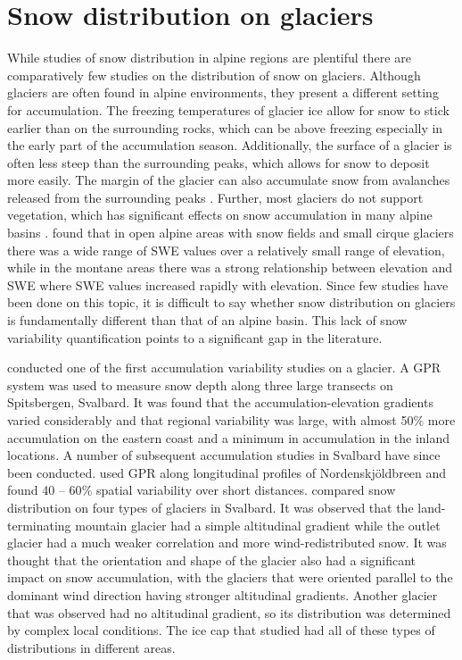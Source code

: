 \documentclass{sfuthesis}
\begin{document}
\section{Snow distribution on glaciers}
While studies of snow distribution in alpine regions are plentiful \citep[and sources within]{Clark2011} there are comparatively few studies on the distribution of snow on glaciers. Although glaciers are often found in alpine environments, they present a different setting for accumulation. The freezing temperatures of glacier ice allow for snow to stick earlier than on the surrounding rocks, which can be above freezing especially in the early part of the accumulation season. Additionally, the surface of a glacier is often less steep than the surrounding peaks, which allows for snow to deposit more easily. The margin of the glacier can also accumulate snow from avalanches released from the surrounding peaks \citep{Bloschl1991, Mott2008}. Further, most glaciers do not support vegetation, which has significant effects on snow accumulation in many alpine basins \citep{Pomeroy1999}. \cite{Alford1985} found that in open alpine areas with snow fields and small cirque glaciers there was a wide range of SWE values over a relatively small range of elevation, while in the montane areas there was a strong relationship between elevation and SWE where SWE values increased rapidly with elevation. Since few studies have been done on this topic, it is difficult to say whether snow distribution on glaciers is fundamentally different than that of an alpine basin. This lack of snow variability quantification points to a significant gap in the literature.

\cite{Winther1998} conducted one of the first accumulation variability studies on a glacier. A GPR system was used to measure snow depth along three large transects on Spitsbergen, Svalbard. It was found that the accumulation-elevation gradients varied considerably and that regional variability was large, with almost 50$\%$ more accumulation on the eastern coast and a minimum in accumulation in the inland locations. A number of subsequent accumulation studies in Svalbard have since been conducted. \cite{Palli2002} used GPR along longitudinal profiles of Nordenskj\"{o}ldbreen and found 40 -- 60$\%$ spatial variability over short distances. \cite{Grabiec2011} compared snow distribution on four types of glaciers in Svalbard. It was observed that the land-terminating mountain glacier had a simple altitudinal gradient while the outlet glacier had a much weaker correlation and more wind-redistributed snow. It was thought that the orientation and shape of the glacier also had a significant impact on snow accumulation, with the glaciers that were oriented parallel to the dominant wind direction having stronger altitudinal gradients. Another glacier that was observed had no altitudinal gradient, so its distribution was determined by complex local conditions. The ice cap that \cite{Grabiec2011} studied had all of these types of distributions in different areas.
\end{document}
